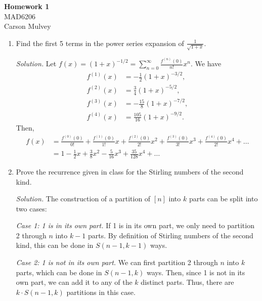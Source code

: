 \documentclass[11pt,letterpaper]{article}
\newenvironment{solution}{\color{Violet}\textit{Solution.}}{\color{black}}
\begin{document}
\begin{center}
    \begin{large}
        \textbf{Homework 1} \\
        MAD6206 \\
        Carson Mulvey
    \end{large}
\end{center}

\begin{enumerate}
    \item Find the first 5 terms in the power series expansion of $\frac{1}{\sqrt{1+x}}$.
    
    \begin{solution}
        Let $f(x)=(1+x)^{-1/2} = \sum_{n=0}^\infty \frac{f^{(n)}(0)}{n!} x^n$. We have
        \begin{align*}
            f^{(1)}(x)&=-\frac{1}{2}(1+x)^{-3/2}, \\
            f^{(2)}(x)&=\frac{3}{4}(1+x)^{-5/2}, \\
            f^{(3)}(x)&=-\frac{15}{8}(1+x)^{-7/2}, \\
            f^{(4)}(x)&=\frac{105}{16}(1+x)^{-9/2}.
        \end{align*}
        Then,
        \begin{align*}
            f(x) &= \frac{f^{(0)}(0)}{0!} + \frac{f^{(1)}(0)}{1!} x + \frac{f^{(2)}(0)}{2!} x^2 + \frac{f^{(3)}(0)}{3!} x^3 + \frac{f^{(4)}(0)}{2!} x^4 + \dots \\
            &= \boxed{1 - \frac{1}{2} x + \frac{3}{8} x^2 - \frac{5}{16} x^3 + \frac{35}{128} x^4} + \dots
        \end{align*}
    \end{solution}

    \item Prove the recurrence given in class for the Stirling numbers of the second kind.
    
    \begin{solution}
        The construction of a partition of $[n]$ into $k$ parts can be split into two cases:

        \textit{Case 1: 1 is in its own part.} If 1 is in its own part, we only need to partition 2 through $n$ into $k-1$ parts. By definition of Stirling numbers of the second kind, this can be done in $S(n-1,k-1)$ ways.

        \textit{Case 2: 1 is not in its own part.} We can first partition 2 through $n$ into $k$ parts, which can be done in $S(n-1,k)$ ways. Then, since 1 is not in its own part, we can add it to any of the $k$ distinct parts. Thus, there are $k\cdot S(n-1,k)$ partitions in this case.


\end{solution}
\end{enumerate}
\end{document}

